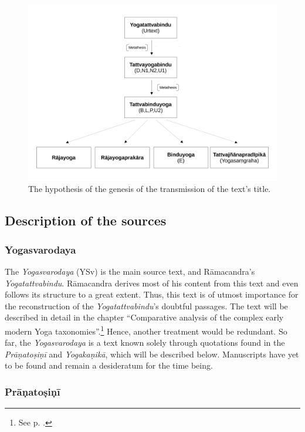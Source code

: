   \begin{figure}[h!]
    \centering
    \includegraphics[width=1\textwidth]{pics/titel-hypothese.pdf} %
    \caption{The hypothesis of the genesis of the transmission of the text's title.}
    \label{fig:titel-hypothese}
\end{figure}

\subsection{Description of the sources}

\subsubsection{Yogasvarodaya}

The \emph{Yogasvarodaya} (YSv) is the main source text, and Rāmacandra's \emph{Yogatattvabindu}. Rāmacandra derives most of his content from this text and even follows its structure to a great extent. Thus, this text is of utmost importance for the reconstruction of the \emph{Yogatattvabindu}'s doubtful passages. The text will be described in detail in the chapter ``Comparative analysis of the complex early modern Yoga taxonomies''.\footnote{See p. \pageref{yogasvarodayadescription}.} Hence, another treatment would be redundant. So far, the \emph{Yogasvarodaya} is a text known solely through quotations found in the \emph{Prāṇatoṣiṇī} and \emph{Yogakaṇikā}, which will be described below. Manuscripts have yet to be found and remain a desideratum for the time being. 

\subsubsection{Prāṇatoṣiṇī}

